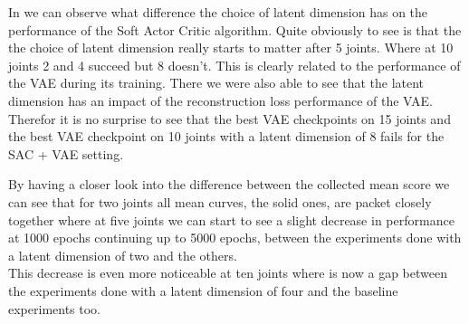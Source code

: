 In  we can observe what difference the choice of latent dimension has on the performance of the Soft Actor Critic algorithm. Quite obviously to see is that the the choice of latent dimension really starts to matter after 5 joints. Where at 10 joints 2 and 4 succeed but 8 doesn't. This is clearly related to the performance of the VAE during its training. There we were also able to see that the latent dimension has an impact of the reconstruction loss performance of the VAE. Therefor it is no surprise to see that the best VAE checkpoints on 15 joints and the best VAE checkpoint on 10 joints with a latent dimension of 8 fails for the SAC + VAE setting. 

By having a closer look into the difference between the collected mean score we can see that for two joints all mean curves, the solid ones, are packet closely together where at five joints we can start to see a slight decrease in performance at 1000 epochs continuing up to 5000 epochs, between the experiments done with a latent dimension of two and the others.\\
This decrease is even more noticeable at ten joints where is now a gap between the experiments done with a latent dimension of four and the baseline experiments too. 
